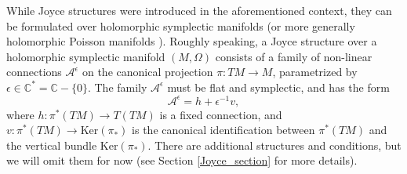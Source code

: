 \documentclass{article}
\theoremstyle{definition}
\numberwithin{equation}{section}
\begin{document}
While Joyce structures were introduced in the aforementioned context, they can be formulated over holomorphic symplectic manifolds (or more generally holomorphic Poisson manifolds \cite{BridgeJoyce}). Roughly speaking, a Joyce structure over a holomorphic symplectic manifold $(M,\Omega)$ consists of a family of non-linear connections $\mathcal{A}^{\epsilon}$ on the canonical projection $\pi:TM \to M$, parametrized by $\epsilon \in \mathbb{C}^{*}=\mathbb{C}-\{0\}$. The family $\mathcal{A}^{\epsilon}$ must be flat and symplectic, and has the form 
\begin{equation}\label{Joyceconn}
    \mathcal{A}^{\epsilon}=h+\epsilon^{-1}v,
\end{equation}
where $h:\pi^*(TM)\to T(TM)$ is a fixed connection, and $v:\pi^*(TM)\to \text{Ker}(\pi_*)$ is the canonical identification between $\pi^*(TM)$ and the vertical bundle $\text{Ker}(\pi_*)$. There are additional structures and conditions, but we will omit them for now (see Section \ref{Joyce_section} for more details).\\
\end{document}
